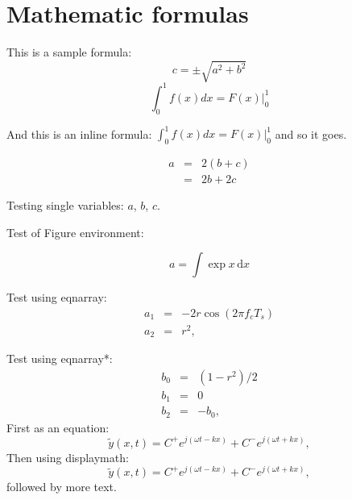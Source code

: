
\section{Mathematic formulas}
This is a sample formula:
$$ c = \pm\sqrt{a^2 + b^2} $$
\begin{displaymath}
\int_0^1 f(x)dx = F(x)|_0^1
\end{displaymath}

And this is an inline formula: $\int_0^1 f(x)dx = F(x)|_0^1$ and
so it goes.

\begin{eqnarray}
  a &=& 2(b+c) \\
    &=& 2b + 2c
\end{eqnarray}

Testing single variables: $a$, $b$, $c$.

Test of Figure environment:
\begin{figure}
\[ a = \int \exp{x} \,\mathrm{d}x \]
\end{figure}

Test using eqnarray:
\begin{eqnarray}
a_1 &=& -2 r \cos( 2 \pi f_c T_s ) \\
a_2 &=& r^2,
\end{eqnarray}

Test using eqnarray*:
\begin{eqnarray*}
b_0 &=& (1 - r^2) / 2 \\
b_1 &=& 0 \\
b_2 &=& -b_0,
\end{eqnarray*}
First as an equation:
\begin{equation}
\tilde{y}(x,t) = C^{+} e^{j (\omega t - k x)} + C^{-} e^{j (\omega t + k x)},
\label{eq:yxt}
\end{equation}
Then using displaymath:
\begin{displaymath}
  \tilde{y}(x,t) = C^{+} e^{j (\omega t - k x)} + C^{-} e^{j (\omega t + k x)},
\end{displaymath}
followed by more text.
